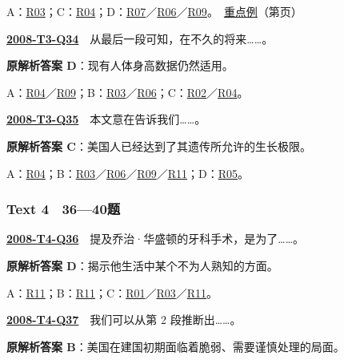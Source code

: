\documentclass[11pt,a4paper]{article}
\begin{document}
\noindent A：\hyperref[cat-R03]{R03}；C：\hyperref[cat-R04]{R04}；D：\hyperref[cat-R07]{R07}／\hyperref[cat-R06]{R06}／\hyperref[cat-R09]{R09}。　\hyperref[case-2008-T3-Q33]{重点例}（第\pageref{case-2008-T3-Q33}页）\par\smallskip
{}\label{idx-2008-T3-Q34}\noindent\textbf{\href{https://zj139.github.io/math-notes/english/a46a979d6c43850d2b57732f/\#q34}{2008-T3-Q34}}　从最后一段可知，在不久的将来……。\par\nopagebreak
\noindent\textbf{原解析答案 D}：现有人体身高数据仍然适用。\par\nopagebreak
\noindent A：\hyperref[cat-R04]{R04}／\hyperref[cat-R09]{R09}；B：\hyperref[cat-R03]{R03}／\hyperref[cat-R06]{R06}；C：\hyperref[cat-R02]{R02}／\hyperref[cat-R04]{R04}。\par\smallskip
{}\label{idx-2008-T3-Q35}\noindent\textbf{\href{https://zj139.github.io/math-notes/english/a46a979d6c43850d2b57732f/\#q35}{2008-T3-Q35}}　本文意在告诉我们……。\par\nopagebreak
\noindent\textbf{原解析答案 C}：美国人已经达到了其遗传所允许的生长极限。\par\nopagebreak
\noindent A：\hyperref[cat-R04]{R04}；B：\hyperref[cat-R03]{R03}／\hyperref[cat-R06]{R06}／\hyperref[cat-R09]{R09}／\hyperref[cat-R11]{R11}；D：\hyperref[cat-R05]{R05}。\par\smallskip
{}\subsubsection{Text 4　36—40题}
\label{idx-2008-T4-Q36}\noindent\textbf{\href{https://zj139.github.io/math-notes/english/a16ec662060c5d5cc8e15f6b/\#q36}{2008-T4-Q36}}　提及乔治·华盛顿的牙科手术，是为了……。\par\nopagebreak
\noindent\textbf{原解析答案 D}：揭示他生活中某个不为人熟知的方面。\par\nopagebreak
\noindent A：\hyperref[cat-R11]{R11}；B：\hyperref[cat-R11]{R11}；C：\hyperref[cat-R01]{R01}／\hyperref[cat-R03]{R03}／\hyperref[cat-R11]{R11}。\par\smallskip
{}\label{idx-2008-T4-Q37}\noindent\textbf{\href{https://zj139.github.io/math-notes/english/a16ec662060c5d5cc8e15f6b/\#q37}{2008-T4-Q37}}　我们可以从第 2 段推断出……。\par\nopagebreak
\noindent\textbf{原解析答案 B}：美国在建国初期面临着脆弱、需要谨慎处理的局面。\par\nopagebreak
\end{document}

